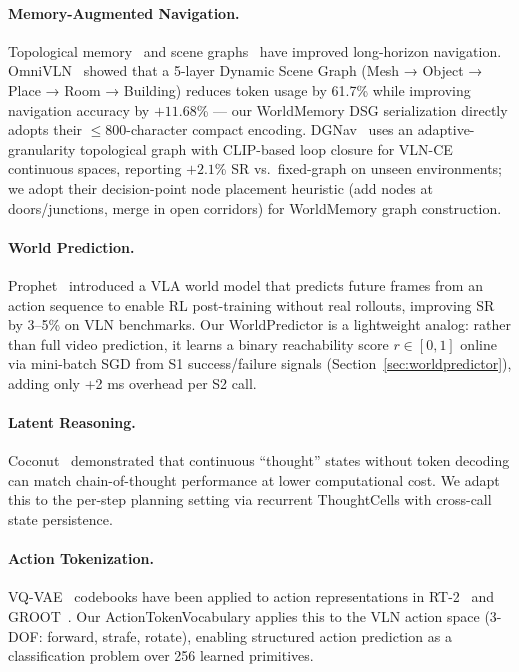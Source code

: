 \documentclass[10pt,twocolumn,letterpaper]{article}
\begin{document}
\paragraph{Memory-Augmented Navigation.}
Topological memory~\cite{savinov2018semiparametric} and scene graphs~\cite{chang2023goat} have improved long-horizon navigation. OmniVLN~\cite{omnivln2025} showed that a 5-layer Dynamic Scene Graph (Mesh → Object → Place → Room → Building) reduces token usage by 61.7\% while improving navigation accuracy by $+11.68$\% — our WorldMemory DSG serialization directly adopts their $\le$800-character compact encoding. DGNav~\cite{dgnav2024} uses an adaptive-granularity topological graph with CLIP-based loop closure for VLN-CE continuous spaces, reporting $+2.1$\% SR vs.\ fixed-graph on unseen environments; we adopt their decision-point node placement heuristic (add nodes at doors/junctions, merge in open corridors) for WorldMemory graph construction.

\paragraph{World Prediction.}
Prophet~\cite{prophet2023} introduced a VLA world model that predicts future frames from an action sequence to enable RL post-training without real rollouts, improving SR by 3--5\% on VLN benchmarks. Our WorldPredictor is a lightweight analog: rather than full video prediction, it learns a binary reachability score $r \in [0,1]$ online via mini-batch SGD from S1 success/failure signals (Section~\ref{sec:worldpredictor}), adding only +2 ms overhead per S2 call.

\paragraph{Latent Reasoning.}
Coconut~\cite{hao2024coconut} demonstrated that continuous ``thought'' states without token decoding can match chain-of-thought performance at lower computational cost. We adapt this to the per-step planning setting via recurrent ThoughtCells with cross-call state persistence.

\paragraph{Action Tokenization.}
VQ-VAE~\cite{vqvae2017} codebooks have been applied to action representations in RT-2~\cite{brohan2023rt2} and GROOT~\cite{groot2023}. Our ActionTokenVocabulary applies this to the VLN action space (3-DOF: forward, strafe, rotate), enabling structured action prediction as a classification problem over 256 learned primitives.
\end{document}
